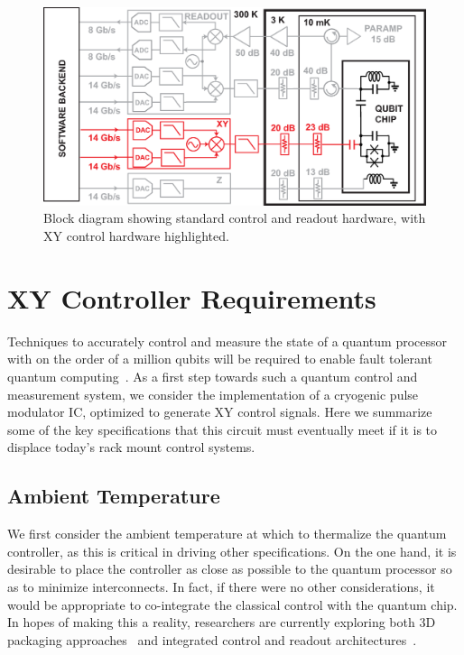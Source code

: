 \documentclass[journal]{IEEEtran}
\newcommand{\CR}[1]{{\color{black}#1}}
\begin{document}
\begin{figure}[bt!]
\begin{center}
\includegraphics[width=\columnwidth]{Figures/FIGURE_6}
\end{center}
\caption{Block diagram showing standard control and readout hardware, with XY control hardware highlighted.}\label{stdXY}
\end{figure}
\section{XY Controller Requirements}\label{requirements}
Techniques to accurately control and measure the state of a quantum processor with on the order of a million qubits will be required to enable fault tolerant quantum computing~\cite{fowler2012surface}. As a first step towards such a quantum control and measurement system, we consider the implementation of a  cryogenic pulse modulator IC, optimized to generate XY control signals. Here we summarize some of the key specifications \CR{that this circuit must eventually meet if it is to displace today's rack mount control systems}. %

\subsection{\CR{Ambient} Temperature}
We first consider the \CR{ambient} temperature at which to thermalize the quantum controller, as this is critical in driving other specifications. On the one hand, it is desirable to place the controller as close as possible to the quantum processor so as to minimize interconnects. In fact, if there were no other considerations, it would be appropriate to co-integrate the classical control with the quantum chip. In hopes of making this a reality, researchers are currently exploring both 3D packaging approaches~\cite{rosenberg20173d} and integrated control and readout architectures~\cite{leonard2019digital,opremcak2018measurement,mcdermott2018quantum}.
\end{document}
